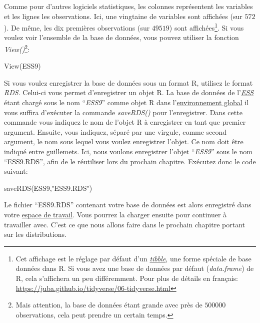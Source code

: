 \documentclass[
]{book}
\newenvironment{Shaded}{\begin{snugshade}}{\end{snugshade}}
\newcommand{\FunctionTok}[1]{\textcolor[rgb]{0.00,0.00,0.00}{#1}}
\newcommand{\NormalTok}[1]{#1}
\newcommand{\StringTok}[1]{\textcolor[rgb]{0.31,0.60,0.02}{#1}}
\begin{document}
Comme pour d'autres logiciels statistiques, les colonnes représentent les variables et les lignes les observations. Ici, une vingtaine de variables sont affichées (sur \(572\)). De même, les dix premières observations (sur \(49519\)) sont affichées\footnote{Cet affichage est le réglage par défaut d'un \href{https://tibble.tidyverse.org/}{\emph{tibble}}, une forme spéciale de base données dans R. Si vous avez une base de données par défaut (\emph{data.frame}) de R, cela s'affichera un peu différemment. Pour plus de détails en français: \url{https://juba.github.io/tidyverse/06-tidyverse.html}}. Si vous voulez voir l'ensemble de la base de données, vous pouvez utiliser la fonction \emph{View()}\footnote{Mais attention, la base de données étant grande avec près de \(500000\) observations, cela peut prendre un certain temps.}:

\begin{Shaded}
\begin{Highlighting}[]
\FunctionTok{View}\NormalTok{(ESS9)}
\end{Highlighting}
\end{Shaded}

Si vous voulez enregistrer la base de données sous un format R, utilisez le format \emph{RDS}. Celui-ci vous permet d'enregistrer un objet R. La base de données de l'\href{https://www.europeansocialsurvey.org/}{\emph{ESS}} étant chargé sous le nom ``\emph{ESS9}'' comme objet R dans l'\protect\hyperlink{objets_envir}{environnement global} il vous suffira d'exécuter la commande \emph{saveRDS()} pour l'enregistrer. Dans cette commande vous indiquez le nom de l'objet R à enregistrer en tant que premier argument. Ensuite, vous indiquez, séparé par une virgule, comme second argument, le nom sous lequel vous voulez enregistrer l'objet. Ce nom doit être indiqué entre guillemets. Ici, nous voulons enregistrer l'objet ``\emph{ESS9}'' sous le nom ``ESS9.RDS'', afin de le réutiliser lors du prochain chapitre. Exécutez donc le code suivant:

\begin{Shaded}
\begin{Highlighting}[]
\FunctionTok{saveRDS}\NormalTok{(ESS9,}\StringTok{"ESS9.RDS"}\NormalTok{)}
\end{Highlighting}
\end{Shaded}

Le fichier ``ESS9.RDS'' contenant votre base de données est alors enregistré dans votre \protect\hyperlink{working_directory}{espace de travail}. Vous pourrez la charger ensuite pour continuer à travailler avec. C'est ce que nous allons faire dans le prochain chapitre portant sur les distributions.
\end{document}
